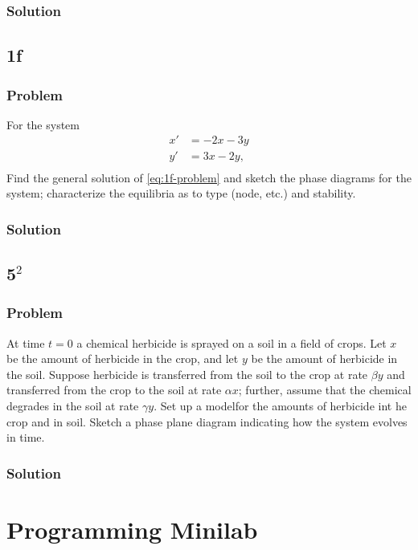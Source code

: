 \documentclass[12pt]{article}
\begin{document}
\subsubsection*{Solution}
\todo[]

\subsection{1f}
\subsubsection*{Problem}
For the system
\begin{equation}
  \label{eq:1f-problem}
  \begin{aligned}
    x'&=-2x-3y\\
    y'&=3x-2y,\\
  \end{aligned}
\end{equation}
Find the general solution of \cref{eq:1f-problem} and sketch the phase diagrams
for the system; characterize the equilibria as to type (node, etc.) and
stability.
\subsubsection*{Solution} \todo[]

\subsection{5$^2$}
\subsubsection*{Problem}
At time $t=0$ a chemical herbicide is sprayed on a soil in a field of crops. Let
$x$ be the amount of herbicide in the crop, and let $y$ be the amount of
herbicide in the soil. Suppose herbicide is transferred from the soil to the
crop at rate $\beta y$ and transferred from the crop to the soil at rate $\alpha
x$; further, assume that the chemical degrades in the soil at rate $\gamma y$.
Set up a modelfor the amounts of herbicide int he crop and in soil. Sketch a
phase plane diagram indicating how the system evolves in time.
\subsubsection*{Solution}
\todo[]

\section{Programming Minilab}
\todo[]
\end{document}

